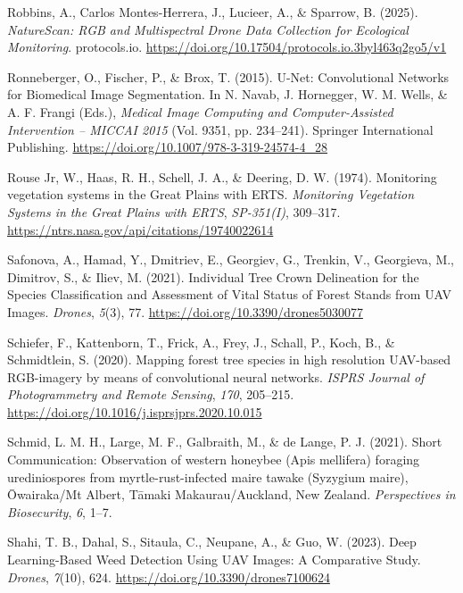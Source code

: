 \documentclass[
]{scrreprt}
\newlength{\cslhangindent}
\newenvironment{CSLReferences}[2] %
 {\begin{list}{}{%
  \setlength{\itemindent}{0pt}
  \setlength{\leftmargin}{0pt}
  \setlength{\parsep}{0pt}
  \setlength{\baselineskip}{12pt}
  \ifodd #1
   \setlength{\leftmargin}{\cslhangindent}
   \setlength{\itemindent}{-1\cslhangindent}
  \fi
  \setlength{\itemsep}{4pt}}}
 {\end{list}}
\begin{document}
\begin{CSLReferences}{1}{0}
Robbins, A., Carlos Montes-Herrera, J., Lucieer, A., \& Sparrow, B.
(2025). \emph{{NatureScan}: {RGB} and {Multispectral Drone Data
Collection} for {Ecological Monitoring}}. protocols.io.
\url{https://doi.org/10.17504/protocols.io.3byl463q2go5/v1}

Ronneberger, O., Fischer, P., \& Brox, T. (2015). U-{Net}:
{Convolutional Networks} for {Biomedical Image Segmentation}. In N.
Navab, J. Hornegger, W. M. Wells, \& A. F. Frangi (Eds.), \emph{Medical
{Image Computing} and {Computer-Assisted Intervention} -- {MICCAI} 2015}
(Vol. 9351, pp. 234--241). Springer International Publishing.
\url{https://doi.org/10.1007/978-3-319-24574-4_28}

Rouse Jr, W., Haas, R. H., Schell, J. A., \& Deering, D. W. (1974).
Monitoring vegetation systems in the {Great Plains} with {ERTS}.
\emph{Monitoring Vegetation Systems in the {Great Plains} with {ERTS}},
\emph{SP-351(I)}, 309--317.
\url{https://ntrs.nasa.gov/api/citations/19740022614}

Safonova, A., Hamad, Y., Dmitriev, E., Georgiev, G., Trenkin, V.,
Georgieva, M., Dimitrov, S., \& Iliev, M. (2021). Individual {Tree Crown
Delineation} for the {Species Classification} and {Assessment} of {Vital
Status} of {Forest Stands} from {UAV Images}. \emph{Drones},
\emph{5}(3), 77. \url{https://doi.org/10.3390/drones5030077}

Schiefer, F., Kattenborn, T., Frick, A., Frey, J., Schall, P., Koch, B.,
\& Schmidtlein, S. (2020). Mapping forest tree species in high
resolution {UAV-based RGB-imagery} by means of convolutional neural
networks. \emph{ISPRS Journal of Photogrammetry and Remote Sensing},
\emph{170}, 205--215.
\url{https://doi.org/10.1016/j.isprsjprs.2020.10.015}

Schmid, L. M. H., Large, M. F., Galbraith, M., \& de Lange, P. J.
(2021). Short {Communication}: {Observation} of western honeybee ({Apis}
mellifera) foraging urediniospores from myrtle-rust-infected maire
tawake ({Syzygium} maire), {Ōwairaka}/{Mt Albert}, {Tāmaki
Makaurau}/{Auckland}, {New Zealand}. \emph{Perspectives in Biosecurity},
\emph{6}, 1--7.

Shahi, T. B., Dahal, S., Sitaula, C., Neupane, A., \& Guo, W. (2023).
Deep {Learning-Based Weed Detection Using UAV Images}: {A Comparative
Study}. \emph{Drones}, \emph{7}(10), 624.
\url{https://doi.org/10.3390/drones7100624}


\end{CSLReferences}
\end{document}
